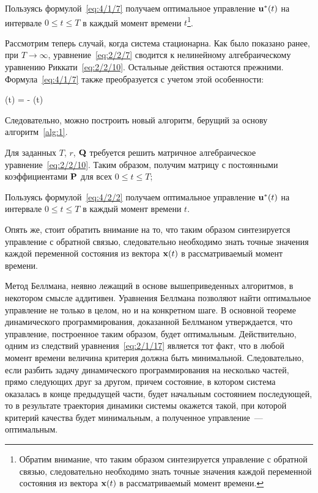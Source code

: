         \item
            Пользуясь формулой~\ref{eq:4/1/7} получаем оптимальное управление $\mathbf{u}^{*}(t)$ на интервале $0 \leqslant t \leqslant T$ в каждый момент времени $t$\footnote{Обратим внимание, что таким образом синтезируется управление с обратной связью, следовательно необходимо знать точные значения каждой переменной состояния из вектора $\mathbf{x}(t)$ в рассматриваемый момент времени.}.
    \eenum
\ealgo

\br

Рассмотрим теперь случай, когда система стационарна. Как было показано ранее, при $T \to \infty$, уравнение~\vref{eq:2/2/7} сводится к нелинейному алгебраическому уравнению Риккати~\vref{eq:2/2/10}. Остальные действия остаются прежними. Формула~\ref{eq:4/1/7} также преобразуется с учетом этой особенности:

    \optU(t) = -  (t) 
\eeq

Следовательно, можно построить новый алгоритм, берущий за основу алгоритм~\ref{alg:1}.

    \benum
        \item
            Для заданных $T$, $r$, $\mathbf{Q}$ требуется решить матричное алгебраическое уравнение~\ref{eq:2/2/10}. Таким образом, получим матрицу с постоянными коэффициентами $\mathbf{P}$ для всех $0 \leqslant t \leqslant T$;

        \item
            Пользуясь формулой~\ref{eq:4/2/2} получаем оптимальное управление $\mathbf{u}^{*}(t)$ на интервале $0 \leqslant t \leqslant T$ в каждый момент времени $t$.
    \eenum
\ealgo

Опять же, стоит обратить внимание на то, что таким образом синтезируется управление с обратной связью, следовательно необходимо знать точные значения каждой переменной состояния из вектора $\mathbf{x}(t)$ в рассматриваемый момент времени.

\br

Метод Беллмана, неявно лежащий в основе вышеприведенных алгоритмов, в некотором смысле аддитивен. Уравнения Беллмана позволяют найти оптимальное управление не только в целом, но и на конкретном шаге. В основной теореме динамического программирования, доказанной Беллманом утверждается, что управление, построенное таким образом, будет оптимальным. Действительно, одним из следствий уравнения~\vref{eq:2/1/17} является тот факт, что в любой момент времени величина критерия должна быть минимальной. Следовательно, если разбить задачу динамического программирования на несколько частей, прямо следующих друг за другом, причем состояние, в котором система оказалась в конце предыдущей части, будет начальным состоянием последующей, то в результате траектория динамики системы окажется такой, при которой критерий качества будет минимальным, а полученное управление~--- оптимальным.


